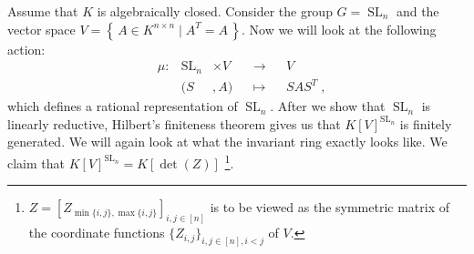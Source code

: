 \begin{dexample}\label{quad}
  Assume that $K$ is algebraically closed.
  Consider the group $G = \operatorname{SL}_n$ and the vector space $ V = \left\{ \, A \in K^{n \times n} \mid A^T = A \, \right\} $.
  Now we will look at the following action:
  \begin{equation*}
    \begin{aligned}
      &\mu \colon & \operatorname{SL}_n &\times  V&&  \longrightarrow  &&V \\
      && (  S  &,   A  )  &&\longmapsto&&  SAS^T \; ,
    \end{aligned}
  \end{equation*}
  which defines a rational representation of $\operatorname{SL}_n$.
  After we show that $\operatorname{SL}_n$ is linearly reductive, Hilbert's finiteness theorem gives us that $K[V]^{\operatorname{SL}_n}$ is finitely generated.
  We will again look at what the invariant ring exactly looks like.
  We claim that $K[V]^{\operatorname{SL}_n} = K[\operatorname{det}(Z)]$ \footnote{$Z = [Z_{\operatorname{min}\{i,j\},\operatorname{max}\{i,j\}}]_{i,j \in [n]}$ is to be viewed as the symmetric matrix of the coordinate functions $\{Z_{i,j}\}_{i,j \in[n],i<j}$ of $V$.}.
\end{dexample}
